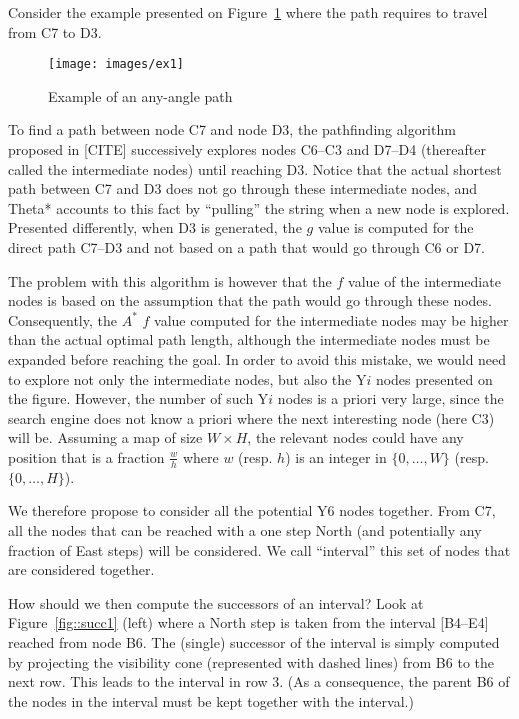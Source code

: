 Consider the example presented on Figure~\ref{fig::ex1} 
where the path requires to travel from C7 to D3.

\begin{figure}[ht]
  \begin{center}
    \texttt{[image: images/ex1]}
  \end{center}
  \caption{Example of an any-angle path}
  \label{fig::ex1}
\end{figure}

To find a path between node C7 and node D3, 
the pathfinding algorithm proposed in [CITE] 
successively explores nodes C6--C3 and D7--D4 
(thereafter called the intermediate nodes) until reaching D3.  
Notice that the actual shortest path between C7 and D3 
does not go through these intermediate nodes, 
and Theta* accounts to this fact by ``pulling'' the string 
when a new node is explored.  
Presented differently, when D3 is generated, 
the $g$ value is computed for the direct path C7--D3 
and not based on a path that would go through C6 or D7.  

The problem with this algorithm 
is however that the $f$ value of the intermediate nodes 
is based on the assumption that the path would go through these nodes.  
Consequently, the $A^*$ $f$ value computed 
for the intermediate nodes may be higher 
than the actual optimal path length, 
although the intermediate nodes must be expanded 
before reaching the goal.  
In order to avoid this mistake, 
we would need to explore not only the intermediate nodes, 
but also the Y$i$ nodes presented on the figure.  
However, the number of such Y$i$ nodes is a priori very large, 
since the search engine does not know a priori 
where the next interesting node (here C3) will be.  
Assuming a map of size $W\times H$, 
the relevant nodes could have any position 
that is a fraction $\frac{w}{h}$ 
where $w$ (resp. $h$) is an integer 
in $\{0,\dots,W\}$ (resp. $\{0,\dots,H\}$).  

We therefore propose to consider all the potential Y6 nodes together.  
From C7, all the nodes that can be reached with a one step North 
(and potentially any fraction of East steps) will be considered.  
We call ``interval'' this set of nodes that are considered together.  

How should we then compute the successors of an interval?  
Look at Figure~\ref{fig::succ1} (left) 
where a North step is taken from the interval [B4--E4] 
reached from node B6.  
The (single) successor of the interval 
is simply computed by projecting the visibility cone 
(represented with dashed lines)
from B6 to the next row.  
This leads to the interval in row 3.  
(As a consequence, the parent B6 of the nodes in the interval 
must be kept together with the interval.)  

